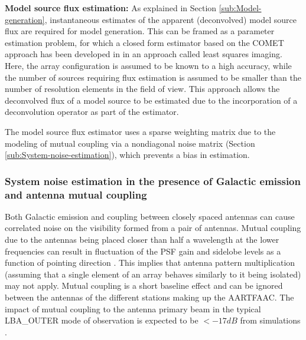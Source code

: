 \documentclass{aa}
\begin{document}
\textbf{Model    source   flux    estimation:}   As    explained    in   Section
\ref{sub:Model-generation},    instantaneous   estimates    of    the   apparent
(deconvolved) model source flux are  required for model generation.  This can be
framed  as a parameter  estimation problem,  for which  a closed  form estimator
based     on     the     COMET     approach    has     been     developed     in
\citep{wijnholds2008fundamental}  in an approach  called least  squares imaging.
Here, the array  configuration is assumed to be known to  a high accuracy, while
the number  of sources requiring flux  estimation is assumed to  be smaller than
the number  of resolution elements in  the field of view.   This approach allows
the deconvolved flux of a model source to be estimated due to the incorporation
of a deconvolution operator as part of the estimator.


  The model  source flux estimator uses a  sparse weighting matrix
due to the modeling of mutual  coupling via a nondiagonal noise matrix (Section
\ref{sub:System-noise-estimation}), which prevents a bias in estimation.

\subsubsection{\label{sub:System-noise-estimation}System noise estimation in the
presence of Galactic emission and antenna mutual coupling}

Both Galactic  emission and coupling  between closely spaced antennas  can cause
correlated  noise on  the  visibility formed  from  a pair  of antennas.  Mutual
coupling due to  the antennas being placed closer than half  a wavelength at the
lower frequencies can result in fluctuation  of the PSF gain and sidelobe levels
as  a function  of pointing  direction \citep{agrawal1972mutual}.   This implies
that antenna pattern multiplication (assuming  that a single element of an array
behaves similarly  to it being  isolated) may not  apply.  Mutual coupling  is a
short baseline effect and can be  ignored between the antennas of the different
stations making  up the AARTFAAC. The  impact of mutual coupling  to the antenna
primary beam  in the typical  LBA\_OUTER mode of  observation is expected  to be
$<-17dB$ from simulations \citep{wijnholds2011situ}.
\end{document}
